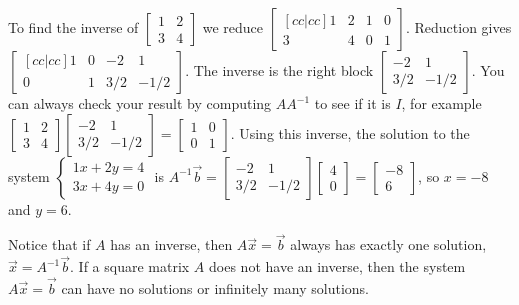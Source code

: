 \begin{example}\label{ex inverse}
To find the inverse of 
$\begin{bmatrix} 1&2\\3&4\end{bmatrix}$ 
we reduce 
$\begin{bmatrix}[cc|cc] 1&2&1&0\\3&4&0&1\end{bmatrix}$.  
Reduction gives 
$\begin{bmatrix}[cc|cc] 1&0&-2&1\\0&1&3/2&-1/2
\end{bmatrix}$. 
The inverse is the right block  
$ \begin{bmatrix} -2&1\\3/2&-1/2
\end{bmatrix}$. 
%
You can always check your result by computing $AA^{-1}$ to see if it is $I$, for example
$\begin{bmatrix} 1&2\\ 3&4\end{bmatrix} \begin{bmatrix} -2&1\\3/2&-1/2\end{bmatrix} 
=  \begin{bmatrix} 1&0\\0&1
\end{bmatrix}$. 
Using this inverse, the solution to the system 
$\begin{cases}1x+2y=4\\3x+4y=0\end{cases}$ is $A^{-1}\vec b 
= \begin{bmatrix} -2&1\\3/2&-1/2\end{bmatrix}
\begin{bmatrix}4\\0\end{bmatrix} 
=  \begin{bmatrix}-8\\6\end{bmatrix}$, so $x=-8$ and $y=6$.
\end{example}

Notice that if $A$ has an inverse, then $A\vec x=\vec b$ always has exactly one solution, $\vec x=A^{-1}\vec b$.  If a square matrix $A$ does not have an inverse, then the system $A\vec x=\vec b$ can have no solutions or infinitely many solutions.

